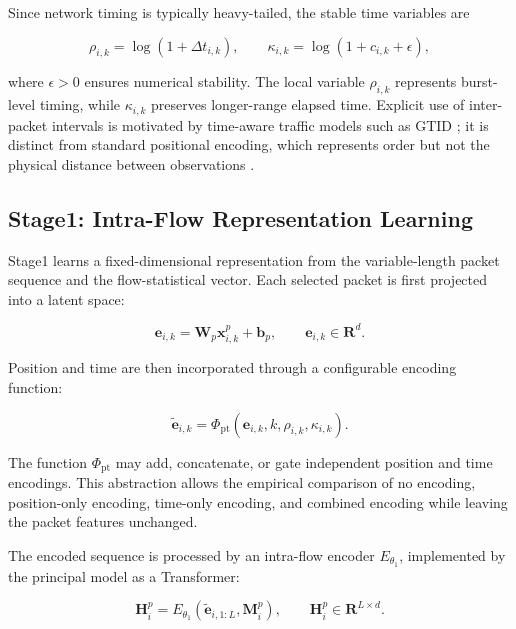 Since network timing is typically heavy-tailed, the stable time variables are

\begin{equation}
\rho_{i,k}=\log(1+\Delta t_{i,k}),
\qquad
\kappa_{i,k}=\log(1+c_{i,k}+\epsilon),
\label{eq:log_time}
\end{equation}

where $\epsilon>0$ ensures numerical stability. The local variable
$\rho_{i,k}$ represents burst-level timing, while $\kappa_{i,k}$ preserves
longer-range elapsed time. Explicit use of inter-packet intervals is motivated
by time-aware traffic models such as GTID \cite{Han2023GTID}; it is distinct
from standard positional encoding, which represents order but not the physical
distance between observations \cite{Vaswani2017}.

\subsection{Stage1: Intra-Flow Representation Learning}
\label{subsec:pf_stage1}

Stage1 learns a fixed-dimensional representation from the variable-length
packet sequence and the flow-statistical vector. Each selected packet is first
projected into a latent space:

\begin{equation}
\mathbf{e}_{i,k}=\mathbf{W}_{p}\mathbf{x}_{i,k}^{p}+\mathbf{b}_{p},
\qquad
\mathbf{e}_{i,k}\in\mathbf{R}^{d}.
\label{eq:packet_projection}
\end{equation}

Position and time are then incorporated through a configurable encoding
function:

\begin{equation}
\widetilde{\mathbf{e}}_{i,k}
=
\Phi_{\mathrm{pt}}
\left(
\mathbf{e}_{i,k},k,\rho_{i,k},\kappa_{i,k}
\right).
\label{eq:position_time_encoding}
\end{equation}

The function $\Phi_{\mathrm{pt}}$ may add, concatenate, or gate independent
position and time encodings. This abstraction allows the empirical comparison
of no encoding, position-only encoding, time-only encoding, and combined
encoding while leaving the packet features unchanged.

The encoded sequence is processed by an intra-flow encoder
$E_{\theta_1}$, implemented by the principal model as a Transformer:

\begin{equation}
\mathbf{H}_{i}^{p}
=
E_{\theta_1}
\left(
\widetilde{\mathbf{e}}_{i,1:L},
\mathbf{M}_{i}^{p}
\right),
\qquad
\mathbf{H}_{i}^{p}\in\mathbf{R}^{L\times d}.
\label{eq:stage1_transformer}
\end{equation}

